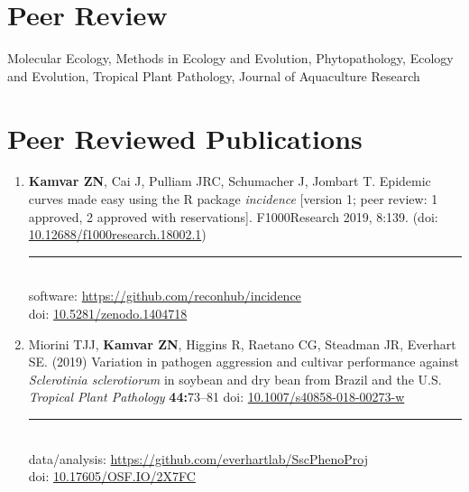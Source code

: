 
\section{Peer Review}

Molecular Ecology, Methods in Ecology and Evolution, Phytopathology,
Ecology and Evolution, Tropical Plant Pathology, Journal of Aquaculture Research

\section{Peer Reviewed Publications}

\begin{enumerate}[leftmargin = 14pt]

  \item \textbf{Kamvar ZN}, Cai J, Pulliam JRC, Schumacher J, Jombart T.
    Epidemic curves made easy using the R package \textit{incidence} [version
    1; peer review: 1 approved, 2 approved with reservations]. F1000Research 2019, 8:139. (doi:
    \href{https://doi.org/10.12688/f1000research.18002.1}{10.12688/f1000research.18002.1})\\
	\rule[0.25\baselineskip]{0.25\textwidth}{0.5pt}\\
  software: \href{https://github.com/reconhub/incidence#readme}{https://github.com/reconhub/incidence}\\
  doi:\phantom{ware:} \href{https://doi.org/10.5281/zenodo.1404718}{10.5281/zenodo.1404718}

	\vspace{3pt}
  
  \item Miorini TJJ, \textbf{Kamvar ZN}, Higgins R, Raetano CG, Steadman JR,
    Everhart SE. (2019) Variation in pathogen aggression and cultivar
    performance against \textit{Sclerotinia sclerotiorum} in soybean and dry
    bean from Brazil and the U.S. \textit{Tropical Plant Pathology} \textbf{44:}73--81 doi:
    \href{https://doi.org/10.1007/s40858-018-00273-w}{10.1007/s40858-018-00273-w}\\
	\rule[0.25\baselineskip]{0.25\textwidth}{0.5pt}\\
  data/analysis: \href{https://github.com/everhartlab/SscPhenoProj#readme}{https://github.com/everhartlab/SscPhenoProj}\\
  doi:\phantom{t/analysis:} \href{https://doi.org/10.17605/OSF.IO/2X7FC}{10.17605/OSF.IO/2X7FC} 

	\vspace{3pt}
  

\end{enumerate}
